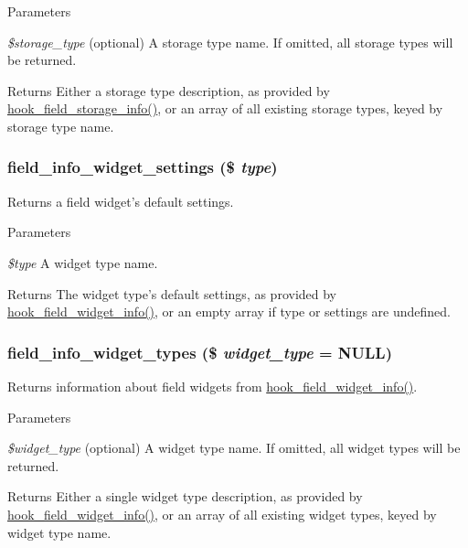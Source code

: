 \begin{DoxyParams}{Parameters}
\item[{\em \$storage\_\-type}](optional) A storage type name. If omitted, all storage types will be returned.\end{DoxyParams}
\begin{DoxyReturn}{Returns}
Either a storage type description, as provided by \hyperlink{group__field__storage_gadc5bfde3133504e946bb0aae8babe6f3}{hook\_\-field\_\-storage\_\-info()}, or an array of all existing storage types, keyed by storage type name. 
\end{DoxyReturn}
\hypertarget{group__field__info_gabc6b57b8aa806a133ebe2f2e7db1712f}{
\subsubsection[{field\_\-info\_\-widget\_\-settings}]{\setlength{\rightskip}{0pt plus 5cm}field\_\-info\_\-widget\_\-settings (\$ {\em type})}}
\label{group__field__info_gabc6b57b8aa806a133ebe2f2e7db1712f}
Returns a field widget's default settings.


\begin{DoxyParams}{Parameters}
\item[{\em \$type}]A widget type name.\end{DoxyParams}
\begin{DoxyReturn}{Returns}
The widget type's default settings, as provided by \hyperlink{group__field__widget_gac53aa6c2a4ac1215660d25b5d7f20792}{hook\_\-field\_\-widget\_\-info()}, or an empty array if type or settings are undefined. 
\end{DoxyReturn}
\hypertarget{group__field__info_gac0e6e70677c9e7901a2064f5bfb1dce8}{
\subsubsection[{field\_\-info\_\-widget\_\-types}]{\setlength{\rightskip}{0pt plus 5cm}field\_\-info\_\-widget\_\-types (\$ {\em widget\_\-type} = {\ttfamily NULL})}}
\label{group__field__info_gac0e6e70677c9e7901a2064f5bfb1dce8}
Returns information about field widgets from \hyperlink{group__field__widget_gac53aa6c2a4ac1215660d25b5d7f20792}{hook\_\-field\_\-widget\_\-info()}.


\begin{DoxyParams}{Parameters}
\item[{\em \$widget\_\-type}](optional) A widget type name. If omitted, all widget types will be returned.\end{DoxyParams}
\begin{DoxyReturn}{Returns}
Either a single widget type description, as provided by \hyperlink{group__field__widget_gac53aa6c2a4ac1215660d25b5d7f20792}{hook\_\-field\_\-widget\_\-info()}, or an array of all existing widget types, keyed by widget type name. 
\end{DoxyReturn}
